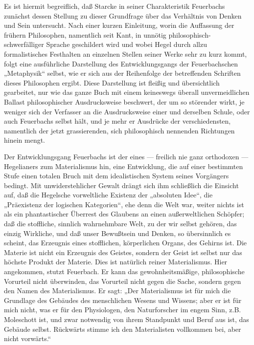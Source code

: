 Es ist hiermit begreiflich, daß Starcke in seiner Charakteristik
Feuerbachs zunächst dessen Stellung zu dieser Grundfrage über das
Verhältnis von Denken und Sein untersucht. Nach einer kurzen Einleitung,
worin die Auffassung der frühern Philosophen, namentlich seit Kant, in
unnötig philosophisch-schwerfälliger Sprache geschildert wird und wobei
Hegel durch allzu formalistisches Festhalten an einzelnen Stellen seiner
Werke sehr zu kurz kommt, folgt eine ausführliche Darstellung des
Entwicklungsgangs der Feuerbachschen „Metaphysik`` selbst, wie er sich
aus der Reihenfolge der betreffenden Schriften dieses Philosophen
ergibt. Diese Darstellung ist fleißig und übersichtlich gearbeitet, nur
wie das ganze Buch mit einem keineswegs überall unvermeidlichen Ballast
philosophischer Ausdrucksweise beschwert, der um so störender wirkt, je
weniger sich der Verfasser an die Ausdrucksweise einer und derselben
Schule, oder auch Feuerbachs selbst hält, und je mehr er Ausdrücke der
verschiedensten, namentlich der jetzt grassierenden, sich philosophisch
nennenden Richtungen hinein mengt.

Der Entwicklungsgang Feuerbachs ist der eines --- freilich nie
ganz orthodoxen --- Hegelianers zum Materialismus hin, eine Entwicklung,
die auf einer bestimmten Stufe einen totalen Bruch mit dem
idealistischen System seines Vorgängers bedingt. Mit unwiderstehlicher
Gewalt drängt sich ihm schließlich die Einsicht auf, daß die Hegelsche
vorweltliche Existenz der „absoluten Idee``, die „Präexistenz der
logischen Kategorien``, ehe denn die Welt war, weiter nichts ist als ein
phantastischer Überrest des Glaubens an einen außerweltlichen Schöpfer;
daß die stoffliche, sinnlich wahrnehmbare Welt, zu der wir selbst
gehören, das einzig Wirkliche, und daß unser Bewußtsein und Denken, so
übersinnlich es scheint, das Erzeugnis eines stofflichen, körperlichen
Organs, des Gehirns ist. Die Materie ist nicht ein Erzeugnis des
Geistes, sondern der Geist ist selbst nur das höchste Produkt der
Materie. Dies ist natürlich reiner Materialismus. Hier angekommen,
stutzt Feuerbach. Er kann das gewohnheitsmäßige, philosophische
Vorurteil nicht überwinden, das Vorurteil nicht gegen die Sache, sondern
gegen den Namen des Materialismus. Er sagt: „Der Materialismus ist für
mich die Grundlage des Gebäudes des menschlichen Wesens und Wissens;
aber er ist für mich nicht, was er für den Physiologen, den
Naturforscher im engem Sinn, z.B. Moleschott ist, und zwar notwendig von
ihrem Standpunkt und Beruf aus ist, das Gebäude selbst. Rückwärts stimme
ich den Materialisten vollkommen bei, aber nicht vorwärts.``

